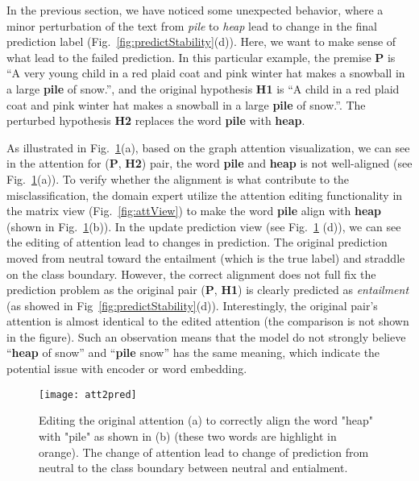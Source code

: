 In the previous section, we have noticed some unexpected behavior, where a minor perturbation of the text from \emph{pile} to \emph{heap} lead to change in the final prediction label (Fig.~\ref{fig:predictStability}(d)). Here, we want to make sense of what lead to the failed prediction. In this particular example, the premise \textbf{P} is ``A very young child in a red plaid coat and pink winter hat makes a snowball in a large \textbf{pile} of snow.'', and the original hypothesis \textbf{H1} is ``A child in a red plaid coat and pink winter hat makes a snowball in a large \textbf{pile} of snow.''. The perturbed hypothesis \textbf{H2} replaces the word \textbf{pile} with \textbf{heap}.

As illustrated in Fig.~\ref{fig:att2pred}(a), based on the graph attention visualization, we can see in the attention for (\textbf{P}, \textbf{H2}) pair, the word \textbf{pile} and \textbf{heap} is not well-aligned (see Fig.~\ref{fig:att2pred}(a)).
%
To verify whether the alignment is what contribute to the misclassification, the domain expert utilize the attention editing functionality in the matrix view (Fig.~\ref{fig:attView}) to make the word \textbf{pile} align with \textbf{heap} (shown in Fig.~\ref{fig:att2pred}(b)).
%
In the update prediction view (see Fig.~\ref{fig:att2pred} (d)), we can see the editing of attention lead to changes in prediction. The original prediction moved from neutral toward the entailment (which is the true label) and straddle on the class boundary. However, the correct alignment does not full fix the prediction problem as the original pair (\textbf{P}, \textbf{H1}) is clearly predicted as \emph{entailment} (as showed in Fig~\ref{fig:predictStability}(d)).
%
Interestingly, the original pair's attention is almost identical to the edited attention (the comparison is not shown in the figure). Such an observation means that the model do not strongly believe ``\textbf{heap} of snow'' and ``\textbf{pile} snow'' has the same meaning, which indicate the potential issue with encoder or word embedding.

\begin{figure}[htbp]
\centering
\vspace{-2mm}
 \texttt{[image: att2pred]}
 \caption{
Editing the original attention (a) to correctly align the word "heap" with "pile" as shown in (b) (these two words are highlight in orange).
The change of attention lead to change of prediction from neutral to the class boundary between neutral and entialment.
%
}
\label{fig:att2pred}
\end{figure}

